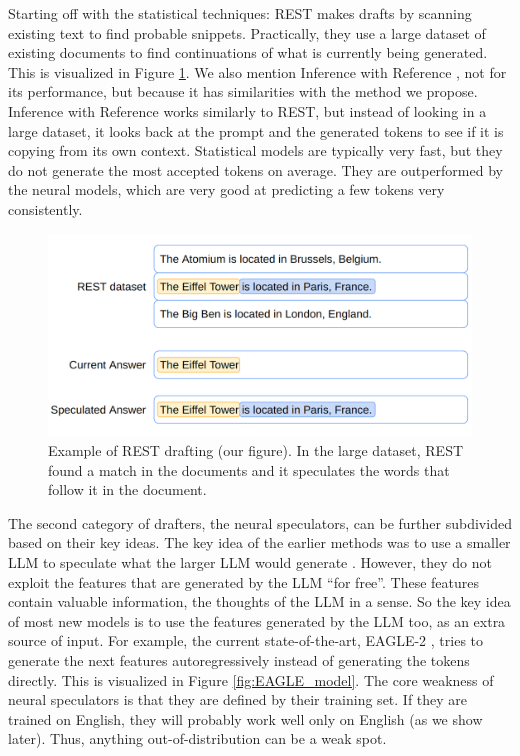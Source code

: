 Starting off with the statistical techniques: REST \cite{he2023rest} makes drafts by scanning existing text to find probable snippets. Practically, they use a large dataset of existing documents to find continuations of what is currently being generated. This is visualized in Figure \ref{fig:spec_dec_rest}. We also mention Inference with Reference \cite{yang2023inference}, not for its performance, but because it has similarities with the method we propose. Inference with Reference works similarly to REST, but instead of looking in a large dataset, it looks back at the prompt and the generated tokens to see if it is copying from its own context. Statistical models are typically very fast, but they do not generate the most accepted tokens on average. They are outperformed by the neural models, which are very good at predicting a few tokens very consistently. 

\begin{figure}[h]
	\centering
	\includegraphics[width=0.7\linewidth]{fig/spec_dec_rest.png}
	\caption{Example of REST \cite{he2023rest} drafting (our figure). In the large dataset, REST found a match in the documents and it speculates the words that follow it in the document.}
	\label{fig:spec_dec_rest}
\end{figure}

The second category of drafters, the neural speculators, can be further subdivided based on their key ideas. The key idea of the earlier methods was to use a smaller LLM to speculate what the larger LLM would generate \cite{leviathan2023fast}. However, they do not exploit the features that are generated by the LLM ``for free''. These features contain valuable information, the thoughts of the LLM in a sense. So the key idea of most new models is to use the features generated by the LLM too, as an extra source of input. For example, the current state-of-the-art, EAGLE-2 \cite{li2024eagle}, tries to generate the next features autoregressively instead of generating the tokens directly. This is visualized in Figure \ref{fig:EAGLE_model}. The core weakness of neural speculators is that they are defined by their training set. If they are trained on English, they will probably work well only on English (as we show later). Thus, anything out-of-distribution can be a weak spot.

